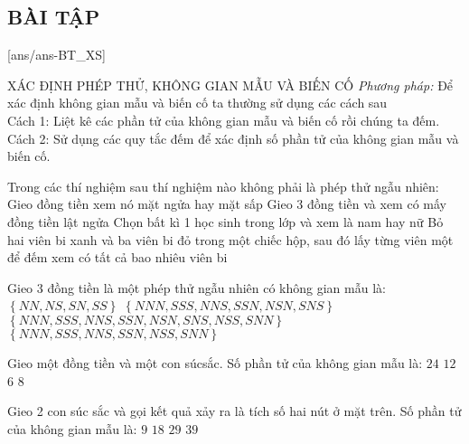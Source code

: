 \subsection{BÀI TẬP}
[ans/ans-BT_XS]
\begin{dang}{XÁC ĐỊNH PHÉP THỬ, KHÔNG GIAN MẪU VÀ BIẾN CỐ}
\textit{Phương pháp:} Để xác định không gian mẫu và biến cố ta thường sử dụng các cách sau\\
Cách 1: Liệt kê các phần tử của không gian mẫu và biến cố rồi chúng ta đếm.\\
Cách 2: Sử dụng các quy tắc đếm để xác định số phần tử của không gian mẫu và biến cố.\\
\end{dang}
\begin{ex}
Trong các thí nghiệm sau thí nghiệm nào không phải là phép thử ngẫu nhiên:
\choice
{Gieo đồng tiền xem nó mặt ngửa hay mặt sấp}
{Gieo $3$ đồng tiền và xem có mấy đồng tiền lật ngửa}
{Chọn bất kì 1 học sinh trong lớp và xem là nam hay nữ}
{\True Bỏ hai viên bi xanh và ba viên bi đỏ trong một chiếc hộp, sau đó lấy từng viên một để đếm xem có tất cả bao nhiêu viên bi}
\end{ex}
\begin{ex}
Gieo 3 đồng tiền là một phép thử ngẫu nhiên có không gian mẫu là:
\choice
{$\left\{ NN,NS,SN,SS \right\}$}
{$\left\{ NNN, SSS, NNS, SSN, NSN, SNS \right\}$}
{\True $\left\{ NNN,SSS,NNS,SSN,NSN,SNS,NSS,SNN \right\}$}
{$\left\{ NNN,SSS,NNS,SSN,NSS,SNN \right\}$}
\end{ex}
\begin{ex}
Gieo một đồng tiền và một con súcsắc. Số phần tử của không gian mẫu là:
\choice
{$24$}
{\True $12$}
{$6$}
{$8$}
\end{ex}
\begin{ex}
Gieo 2 con súc sắc và gọi kết quả xảy ra là tích số hai nút ở mặt trên. Số phần tử của không gian mẫu là:
\choice
{$9$}
{\True $18$}
{$29$}
{$39$}
\end{ex}
